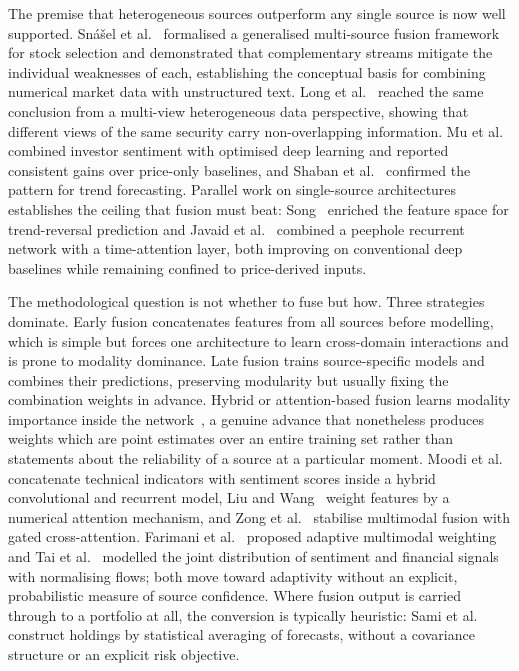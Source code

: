 The premise that heterogeneous sources outperform any single source is now well
supported. Sn\'a\v{s}el et al.~\cite{snasel2024} formalised a generalised multi-source
fusion framework for stock selection and demonstrated that complementary streams
mitigate the individual weaknesses of each, establishing the conceptual basis for
combining numerical market data with unstructured text. Long et al.~\cite{long2024}
reached the same conclusion from a multi-view heterogeneous data perspective, showing
that different views of the same security carry non-overlapping information. Mu et
al.~\cite{mu2023investor} combined investor sentiment with optimised deep learning and
reported consistent gains over price-only baselines, and Shaban et al.~\cite{shaban2024}
confirmed the pattern for trend forecasting. Parallel work on single-source architectures
establishes the ceiling that fusion must beat: Song~\cite{song2024} enriched the feature
space for trend-reversal prediction and Javaid et al.~\cite{javaid2024} combined a peephole
recurrent network with a time-attention layer, both improving on conventional deep
baselines while remaining confined to price-derived inputs.

The methodological question is not whether to fuse but how. Three strategies dominate.
Early fusion concatenates features from all sources before modelling, which is simple but
forces one architecture to learn cross-domain interactions and is prone to modality
dominance. Late fusion trains source-specific models and combines their predictions,
preserving modularity but usually fixing the combination weights in advance. Hybrid or
attention-based fusion learns modality importance inside the
network~\cite{choi2023,haryono2023}, a genuine advance that nonetheless produces weights
which are point estimates over an entire training set rather than statements about the
reliability of a source at a particular moment. Moodi et al.~\cite{moodi2024} concatenate technical indicators with sentiment
scores inside a hybrid convolutional and recurrent model, Liu and
Wang~\cite{liu2019attention} weight features by a numerical attention mechanism, and
Zong et al.~\cite{zong2025} stabilise multimodal fusion with gated cross-attention.
Farimani et al.~\cite{farimani2024} proposed adaptive multimodal weighting and
Tai et al.~\cite{tai2022} modelled the joint distribution of sentiment and financial
signals with normalising flows; both move toward adaptivity without an explicit,
probabilistic measure of source confidence. Where fusion output is carried through to a
portfolio at all, the conversion is typically heuristic: Sami et al.~\cite{sami2025}
construct holdings by statistical averaging of forecasts, without a covariance structure
or an explicit risk objective.

